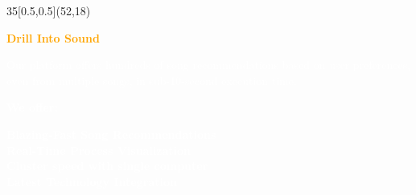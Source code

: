 \documentclass{beamer}
\begin{document}
\begin{textblock}{35}[0.5,0.5](52,18)
    \begin{basebox}[frame hidden, interior hidden, halign=center, valign=center]
        \centering
        \textcolor{orange}{\VERYHuge \textbf{Drill Into Sound}}\\[0.3cm]
        
        \vspace{1.5cm}
        
        \begin{minipage}{0.85\linewidth}
            \centering
            \textcolor{white}{\Large Our platform offers hundreds of song recommendations based on user preferences, even from multiple songs, in sub-10-second execution time.}
            
            \vspace{1cm}
            
            \textcolor{white}{\Large \textbf{We offer:}}
            
            \vspace{0.5cm}
            
            \textcolor{white}{
                \Large\textbf{Blazing-Fast Song Recommendations}\\[0.6cm]
                \textbf{Real-Time Process Visualization}\\
                [0.6cm]
                \textbf{Cluster speed with single computer}\\[0.6cm]
                \textbf{Latest Technology Integration}
            }
        \end{minipage}
        
        \vspace{2cm}
        
    \end{basebox}
\end{textblock}
\end{document}
